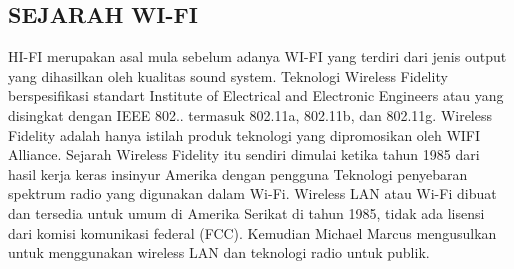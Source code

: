 \subsection {SEJARAH WI-FI}
HI-FI merupakan asal mula sebelum adanya WI-FI yang terdiri dari jenis output yang dihasilkan oleh kualitas sound system. Teknologi Wireless Fidelity berspesifikasi standart Institute of Electrical and Electronic Engineers atau yang disingkat dengan IEEE 802.. termasuk 802.11a, 802.11b, dan 802.11g. Wireless Fidelity adalah hanya istilah produk teknologi yang dipromosikan oleh WIFI Alliance.
Sejarah Wireless Fidelity itu sendiri dimulai ketika tahun 1985 dari hasil kerja keras insinyur Amerika dengan pengguna Teknologi penyebaran spektrum radio yang digunakan dalam Wi-Fi. Wireless LAN atau Wi-Fi dibuat dan tersedia untuk umum di Amerika Serikat di tahun 1985, tidak ada lisensi dari komisi komunikasi federal (FCC). Kemudian Michael Marcus mengusulkan untuk menggunakan wireless LAN dan teknologi radio untuk publik.

